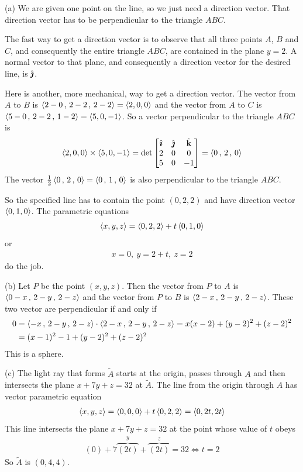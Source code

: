 \begin{solution}
(a) We are given one point on the line, so we just need a
direction vector. That direction vector has to be perpendicular to the 
triangle $ABC$.

The fast way to get a direction vector is to observe that all 
three points $A$, $B$ and $C$, and consequently the entire triangle $ABC$,
are contained in the plane $y=2$. A normal vector to that plane, and 
consequently a direction vector for the desired line, is $\hat{\pmb{\jmath}}$.

Here is another, more mechanical, way to get a direction vector.
The vector from $A$ to $B$ is $\left< 2-0\,,\,2-2\,,\,2-2\right>= \left< 2,0,0\right>$
and the vector from $A$ to $C$ is $\left< 5-0\,,\,2-2\,,\,1-2\right>= 
\left< 5,0,-1\right>$. So a vector perpendicular to the triangle $ABC$ is
\begin{align*}
\left< 2,0,0\right> \times \left< 5,0,-1\right>
=\det\left[\begin{matrix}
            \hat{\pmb{\imath}}  &  \hat{\pmb{\jmath}}  &  \hat{\mathbf{k}} \\
            2    &   0   &    0 \\
            5    &   0   &   -1 
            \end{matrix}\right]
=\left< 0 \,,\, 2 \,,\, 0 \right>
\end{align*}
The vector $\frac{1}{2}\left< 0 \,,\, 2 \,,\, 0 \right>=\left< 0 \,,\, 1 \,,\, 0 \right>$
is also perpendicular to the triangle $ABC$. 

So the specified line has to contain the point $(0,2,2)$ and have direction
vector $\left< 0 , 1 , 0 \right>$. The parametric equations
\begin{align*}
\left< x,y,z \right> = \left< 0 , 2 , 2 \right> + t\left< 0 , 1 , 0 \right>
\end{align*}
or
\begin{align*}
x=0,\ 
y=2+t,\ 
z=2
\end{align*}
do the job.


\goodbreak
(b) Let $P$ be the point $(x,y,z)$. Then the vector from  $P$ to $A$
is $\left< 0-x\,,\,2-y\,,\,2-z\right>$ and the vector from  $P$ to $B$
is $\left< 2-x\,,\,2-y\,,\,2-z\right>$. These two vector are perpendicular
if and only if
\begin{align*}
0 &= \left< -x\,,\,2-y\,,\,2-z\right> \cdot \left< 2-x\,,\,2-y\,,\,2-z\right>
  = x(x-2) +(y-2)^2 +(z-2)^2 \\
  &= (x-1)^2 -1 +(y-2)^2 +(z-2)^2 
\end{align*}
This is a sphere.

(c) 
The light ray that forms $\tilde A$ starts at the origin,
passes through $A$ and then intersects the plane $x+7y+z=32$
at $\tilde A$. The line from the origin through $A$ has vector
parametric equation
\begin{align*}
\left< x,y,z\right> = \left< 0,0,0 \right> +t \left< 0,2,2\right>
               =\left< 0,2t,2t\right>
\end{align*}
This line intersects the plane $x+7y+z=32$ at the point whose value of $t$
obeys
\begin{align*}
(0) +7\overbrace{(2t)}^{y} +\overbrace{(2t)}^{z} =32
\iff t=2
\end{align*}
So $\tilde A$ is $(0,4,4)$.
\end{solution}

